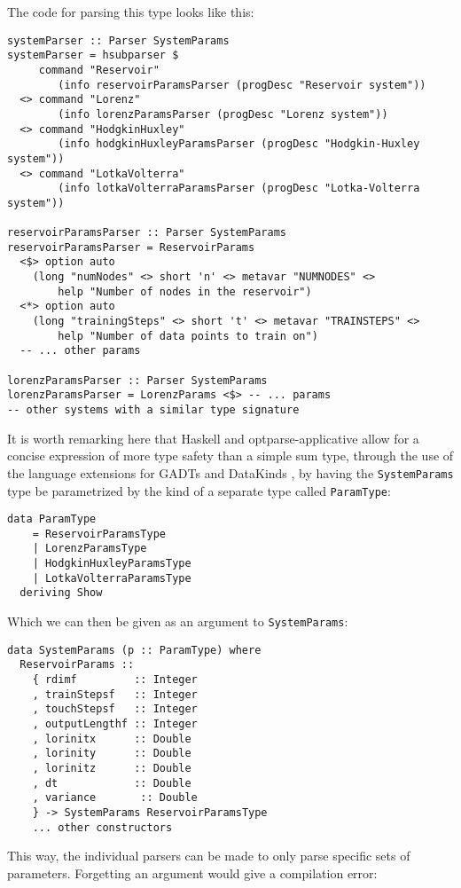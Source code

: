 The code for parsing this type looks like this:
\begin{verbatim}
systemParser :: Parser SystemParams
systemParser = hsubparser $ 
     command "Reservoir" 
        (info reservoirParamsParser (progDesc "Reservoir system"))
  <> command "Lorenz" 
        (info lorenzParamsParser (progDesc "Lorenz system"))
  <> command "HodgkinHuxley" 
        (info hodgkinHuxleyParamsParser (progDesc "Hodgkin-Huxley system"))
  <> command "LotkaVolterra" 
        (info lotkaVolterraParamsParser (progDesc "Lotka-Volterra system"))

reservoirParamsParser :: Parser SystemParams
reservoirParamsParser = ReservoirParams
  <$> option auto 
    (long "numNodes" <> short 'n' <> metavar "NUMNODES" <> 
        help "Number of nodes in the reservoir")
  <*> option auto 
    (long "trainingSteps" <> short 't' <> metavar "TRAINSTEPS" <> 
        help "Number of data points to train on")
  -- ... other params

lorenzParamsParser :: Parser SystemParams
lorenzParamsParser = LorenzParams <$> -- ... params
-- other systems with a similar type signature
\end{verbatim}

It is worth remarking here that Haskell and optparse-applicative allow for a concise expression of more type safety than a simple sum type, through the use of the language extensions for GADTs \cite{ghc-gadts} and DataKinds \cite{ghc-data-kinds}, by having the \texttt{SystemParams} type be parametrized by the kind of a separate type called \texttt{ParamType}:

\begin{verbatim}
data ParamType
    = ReservoirParamsType 
    | LorenzParamsType 
    | HodgkinHuxleyParamsType 
    | LotkaVolterraParamsType
  deriving Show
\end{verbatim}

Which we can then be given as an argument to \texttt{SystemParams}:
\begin{verbatim}
data SystemParams (p :: ParamType) where
  ReservoirParams :: 
    { rdimf         :: Integer
    , trainStepsf   :: Integer
    , touchStepsf   :: Integer
    , outputLengthf :: Integer
    , lorinitx      :: Double
    , lorinity      :: Double
    , lorinitz      :: Double
    , dt            :: Double
    , variance       :: Double
    } -> SystemParams ReservoirParamsType
    ... other constructors
\end{verbatim}

This way, the individual parsers can be made to only parse specific sets of parameters. Forgetting an argument would give a compilation error:

